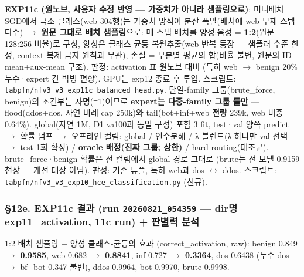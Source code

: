 \textbf{EXP11c (원노브, 사용자 수정 반영 — 가중치가 아니라 샘플링으로)}: 미니배치 SGD에서 극소 클래스(web 304행)는 가중치 방식이 분산 폭발(배치에 web 부재 스텝 다수)  \ensuremath{\rightarrow}  \textbf{원문 그대로 배치 샘플링}으로: 매 스텝 배치를 양성:음성 =\allowbreak{} \textbf{1:2}(원문 128:256 비율)로 구성, 양성은 클래스-균등 복원추출(web 반복 등장 — 샘플러 수준 한정, context 복제 금지 원칙과 무관), 손실 =\allowbreak{} 부분별 평균의 합(비율-불변, 원문의 ID-mean+\allowbreak{}aux-mean 구조). 판정: activation 표 원노브 대비 (특히 web \ensuremath{\rightarrow} benign 20\% 누수·expert 간 박빙 편향). GPU는 exp12 종료 후 투입. 스크립트: \texttt{tabpfn/\allowbreak{}\allowbreak{}n\allowbreak{}fv3\_\allowbreak{}\allowbreak{}v3\_\allowbreak{}\allowbreak{}e\allowbreak{}xp11c\_\allowbreak{}\allowbreak{}ba\allowbreak{}lanced\_\allowbreak{}\allowbreak{}h\allowbreak{}ead.\allowbreak{}py}. 단일-family 그룹(brute\_\allowbreak{}force, benign)의 조건부는 자명(≡1)이므로 \textbf{expert는 다중-family 그룹 둘만} — flood(ddos+\allowbreak{}dos, 자연 비례 cap 250k)와 tail(bot+\allowbreak{}inf+\allowbreak{}web \textbf{전량} 239k, web 비중 0.64\%). global(자연 1M, D1 va100과 동일 구성) 포함 3 fit, test·val 양쪽 predict  \ensuremath{\rightarrow}  확률 덤프  \ensuremath{\rightarrow}  오프라인 컬럼: global /\allowbreak{} 인수분해 /\allowbreak{} λ-블렌드(λ 하나만 val 선택 \ensuremath{\rightarrow} test 1회 확정) /\allowbreak{} \textbf{oracle 배정(진짜 그룹; 상한)} /\allowbreak{} hard routing(대조군). brute\_\allowbreak{}force·benign 확률은 전 컬럼에서 global 경로 그대로 (brute는 전 모델 0.9159 천장 — 개선 대상 아님). 판정: 기존 튜플, 특히 web과 dos \ensuremath{\leftrightarrow} ddos. 스크립트: \texttt{tabpfn/\allowbreak{}\allowbreak{}n\allowbreak{}fv3\_\allowbreak{}\allowbreak{}v3\_\allowbreak{}\allowbreak{}e\allowbreak{}xp10\_\allowbreak{}\allowbreak{}hce\allowbreak{}\_\allowbreak{}\allowbreak{}classif\allowbreak{}ication.\allowbreak{}py} (신규).

\subsubsection{§12e. EXP11c 결과 (run \texttt{20260821\allowbreak{}\_\allowbreak{}\allowbreak{}054359} — dir명 exp11\_\allowbreak{}activation, 11c run) +\allowbreak{} 판별력 분석}
1:2 배치 샘플링 +\allowbreak{} 양성 클래스-균등의 효과 (correct\_\allowbreak{}activation, raw): benign 0.849 \ensuremath{\rightarrow} \textbf{0.9585}, web 0.682 \ensuremath{\rightarrow} \textbf{0.8841}, inf 0.727 \ensuremath{\rightarrow} \textbf{0.3364}, dos 0.6438 (누수 dos \ensuremath{\rightarrow} bf\_\allowbreak{}bot 0.347 불변), ddos 0.9964, bot 0.9970, brute 0.9998.

